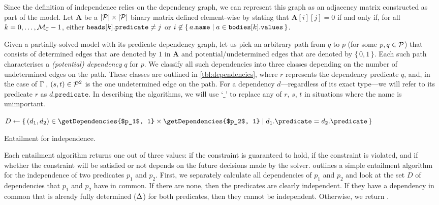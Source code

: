 Since the definition of independence relies on the dependency graph, we can
represent this graph as an adjacency matrix constructed as part of the model.
Let $\mathbf{A}$ be a $|\mathcal{P}{}| \times |\mathcal{P}{}|$ binary matrix
defined element-wise by stating that $\mathbf{A}[i][j] = 0$ if and only if, for
all $k = 0, \dots, \mathcal{M}_{\mathcal{C}}{} - 1$, either
$\texttt{\textup{heads}}[k].\texttt{\textup{predicate}} \ne j$ or
$ i \not\in \{\, a.\texttt{\textup{name}} \mid a \in \texttt{\textup{bodies}}[k].\texttt{\textup{values}} \,\}$.

Given a partially-solved model with its predicate dependency graph, let us pick
an arbitrary path from $q$ to $p$ (for some $p, q \in \mathcal{P}{}$) that
consists of determined edges that are denoted by $1$ in $\mathbf{A}$ and
potential/undetermined edges that are denoted by $\{\, 0, 1 \,\}$. Each such
path characterises a \emph{(potential) dependency} $q$ for $p$. We classify all
such dependencies into three classes depending on the number of undetermined
edges on the path. These classes are outlined in \cref{tbl:dependencies}, where
$r$ represents the dependency predicate $q$, and, in the case of
$\operatorname{\Gamma}{}$, $(s, t) \in \mathcal{P}{}^2$ is the one undetermined edge
on the path. For a dependency $d$---regardless of its exact type---we will refer
to its predicate $r$ as $d.\mathtt{predicate}$. In describing the algorithms, we
will use `$\_$' to replace any of $r$, $s$, $t$ in situations where the name is
unimportant.

\begin{algorithm}[t]
  $D \gets \{\, (d_1, d_2) \in \getDependencies{$p_1$, 1} \times \getDependencies{$p_2$, 1} \mid d_1.\predicate = d_2.\predicate \,\}$\;
  \caption{Entailment for independence.}\label{alg:independence_entailment}
\end{algorithm}

Each entailment algorithm returns one out of three values: \true{} if the
constraint is guaranteed to hold, \false{} if the constraint is violated, and
\undefined{} if whether the constraint will be satisfied or not depends on the
future decisions made by the solver.  outlines
a simple entailment algorithm for the independence of two predicates $p_1$ and
$p_2$. First, we separately calculate all dependencies of $p_1$ and $p_2$ and
look at the set $D$ of dependencies that $p_1$ and $p_2$ have in common. If
there are none, then the predicates are clearly independent. If they have a
dependency in common that is already fully determined ($\operatorname{\Delta}$) for both
predicates, then they cannot be independent. Otherwise, we return \undefined{}.

